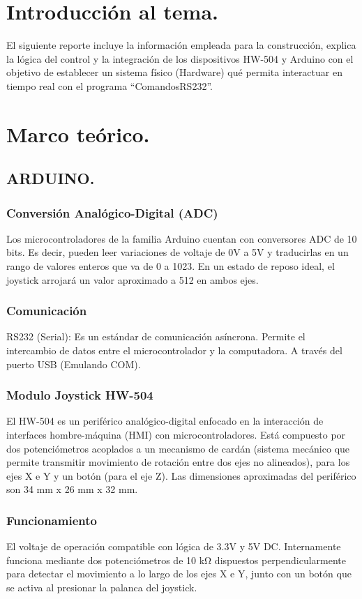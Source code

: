 \documentclass[conference]{IEEEtran}
\begin{document}

\section{Introducción al tema.}
El siguiente reporte incluye la información empleada para la construcción, explica la lógica del control y la integración de los dispositivos HW-504 y Arduino con el objetivo de establecer un sistema físico (Hardware) qué permita interactuar en tiempo real con el programa ``ComandosRS232''.

\section{Marco teórico.}
  \subsection{ARDUINO.}
    \subsubsection{Conversión Analógico-Digital (ADC)}
    Los microcontroladores de la familia Arduino cuentan con conversores ADC de 10 bits. Es decir, pueden leer variaciones de voltaje de 0V a 5V y traducirlas en un rango de valores enteros que va de 0 a 1023. En un estado de reposo ideal, el joystick arrojará un valor aproximado a 512 en ambos ejes.
    \subsubsection{Comunicación}
    RS232 (Serial): Es un estándar de comunicación asíncrona. Permite el intercambio de datos entre el microcontrolador y la computadora. A través del puerto USB (Emulando COM).

    \subsubsection{Modulo Joystick HW-504}
    El HW-504 es un periférico analógico-digital enfocado en la interacción de interfaces hombre-máquina (HMI) con microcontroladores. Está compuesto por dos potenciómetros acoplados a un mecanismo de cardán (sistema mecánico que permite transmitir movimiento de rotación entre dos ejes no alineados), para los ejes X e Y y un botón (para el eje Z). Las dimensiones aproximadas del periférico son 34 mm x 26 mm x 32 mm.

    \subsubsection{Funcionamiento}
    El voltaje de operación compatible con lógica de 3.3V y 5V DC. Internamente funciona mediante dos potenciómetros de 10 kΩ dispuestos perpendicularmente para detectar el movimiento a lo largo de los ejes X e Y, junto con un botón que se activa al presionar la palanca del joystick.
\end{document}
